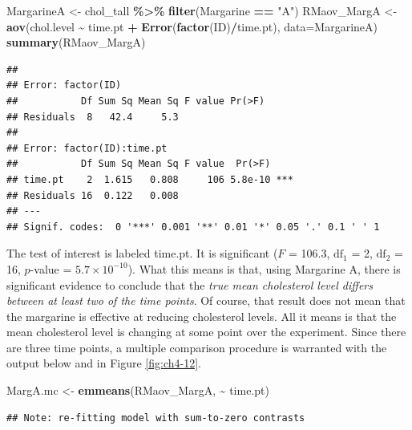\documentclass[
]{book}
\newenvironment{Shaded}{\begin{snugshade}}{\end{snugshade}}
\newcommand{\AttributeTok}[1]{\textcolor[rgb]{0.13,0.29,0.53}{#1}}
\newcommand{\FunctionTok}[1]{\textcolor[rgb]{0.13,0.29,0.53}{\textbf{#1}}}
\newcommand{\NormalTok}[1]{#1}
\newcommand{\OtherTok}[1]{\textcolor[rgb]{0.56,0.35,0.01}{#1}}
\newcommand{\SpecialCharTok}[1]{\textcolor[rgb]{0.81,0.36,0.00}{\textbf{#1}}}
\newcommand{\StringTok}[1]{\textcolor[rgb]{0.31,0.60,0.02}{#1}}
\begin{document}
\begin{Shaded}
\begin{Highlighting}[]
\NormalTok{MargarineA }\OtherTok{\textless{}{-}}\NormalTok{ chol\_tall }\SpecialCharTok{\%\textgreater{}\%} 
  \FunctionTok{filter}\NormalTok{(Margarine }\SpecialCharTok{==} \StringTok{"A"}\NormalTok{)}
\NormalTok{RMaov\_MargA }\OtherTok{\textless{}{-}} \FunctionTok{aov}\NormalTok{(chol.level }\SpecialCharTok{\textasciitilde{}}\NormalTok{ time.pt }\SpecialCharTok{+} \FunctionTok{Error}\NormalTok{(}\FunctionTok{factor}\NormalTok{(ID)}\SpecialCharTok{/}\NormalTok{time.pt), }\AttributeTok{data=}\NormalTok{MargarineA)}
\FunctionTok{summary}\NormalTok{(RMaov\_MargA)}
\end{Highlighting}
\end{Shaded}

\begin{verbatim}
## 
## Error: factor(ID)
##           Df Sum Sq Mean Sq F value Pr(>F)
## Residuals  8   42.4     5.3               
## 
## Error: factor(ID):time.pt
##           Df Sum Sq Mean Sq F value  Pr(>F)    
## time.pt    2  1.615   0.808     106 5.8e-10 ***
## Residuals 16  0.122   0.008                    
## ---
## Signif. codes:  0 '***' 0.001 '**' 0.01 '*' 0.05 '.' 0.1 ' ' 1
\end{verbatim}

The test of interest is labeled time.pt. It is significant (\(F\) = 106.3, \(\textrm{df}_1\) = 2, \(\textrm{df}_2\) = 16, \(p\)-value = \(5.7 \times 10^{-10}\)). What this means is that, using Margarine A, there is significant evidence to conclude that the \emph{true mean cholesterol level differs between at least two of the time points}. Of course, that result does not mean that the margarine is effective at reducing cholesterol levels. All it means is that the mean cholesterol level is changing at some point over the experiment. Since there are three time points, a multiple comparison procedure is warranted with the output below and in Figure \ref{fig:ch4-12}.

\begin{Shaded}
\begin{Highlighting}[]
\NormalTok{MargA.mc }\OtherTok{\textless{}{-}} \FunctionTok{emmeans}\NormalTok{(RMaov\_MargA, }\SpecialCharTok{\textasciitilde{}}\NormalTok{ time.pt)}
\end{Highlighting}
\end{Shaded}

\begin{verbatim}
## Note: re-fitting model with sum-to-zero contrasts
\end{verbatim}
\end{document}
